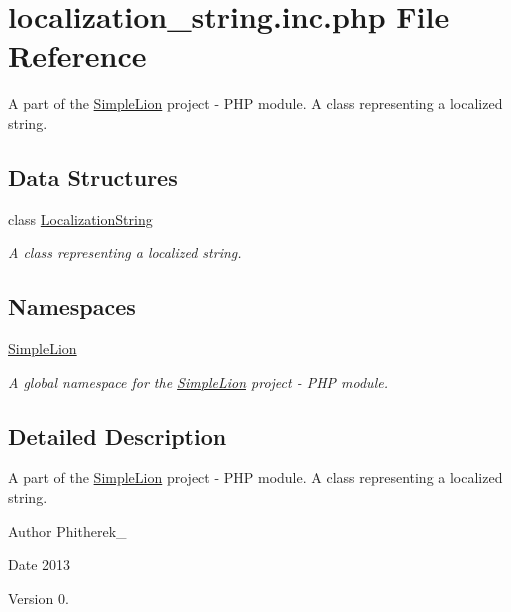 \hypertarget{localization__string_8inc_8php}{\section{localization\-\_\-string.\-inc.\-php File Reference}
\label{localization__string_8inc_8php}
}


A part of the \hyperlink{namespace_simple_lion}{Simple\-Lion} project -\/ P\-H\-P module. A class representing a localized string.  


\subsection*{Data Structures}
\begin{DoxyCompactItemize}
\item 
class \hyperlink{class_simple_lion_1_1_localization_string}{Localization\-String}
\begin{DoxyCompactList}\small\item\em A class representing a localized string. \end{DoxyCompactList}\end{DoxyCompactItemize}
\subsection*{Namespaces}
\begin{DoxyCompactItemize}
\item 
\hyperlink{namespace_simple_lion}{Simple\-Lion}
\begin{DoxyCompactList}\small\item\em A global namespace for the \hyperlink{namespace_simple_lion}{Simple\-Lion} project -\/ P\-H\-P module. \end{DoxyCompactList}\end{DoxyCompactItemize}


\subsection{Detailed Description}
A part of the \hyperlink{namespace_simple_lion}{Simple\-Lion} project -\/ P\-H\-P module. A class representing a localized string. \begin{DoxyAuthor}{Author}
Phitherek\-\_\- 
\end{DoxyAuthor}
\begin{DoxyDate}{Date}
2013 
\end{DoxyDate}
\begin{DoxyVersion}{Version}
0. 
\end{DoxyVersion}
